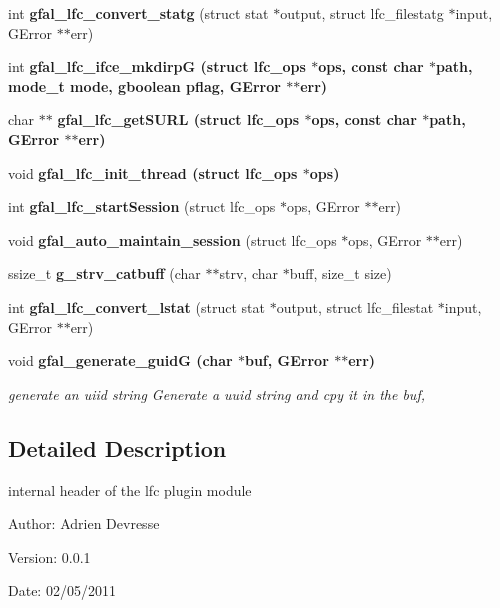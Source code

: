 \begin{CompactItemize}
\item 
int \textbf{gfal\_\-lfc\_\-convert\_\-statg} (struct stat $\ast$output, struct lfc\_\-filestatg $\ast$input, GError $\ast$$\ast$err)\label{lfc__ifce__ng_8h_79cceda78f871c9bd8568a636dd31206}

\item 
int \bf{gfal\_\-lfc\_\-ifce\_\-mkdirp\-G} (struct lfc\_\-ops $\ast$ops, const char $\ast$path, mode\_\-t mode, gboolean pflag, GError $\ast$$\ast$err)
\item 
char $\ast$$\ast$ \bf{gfal\_\-lfc\_\-get\-SURL} (struct lfc\_\-ops $\ast$ops, const char $\ast$path, GError $\ast$$\ast$err)
\item 
void \bf{gfal\_\-lfc\_\-init\_\-thread} (struct lfc\_\-ops $\ast$ops)
\item 
int \textbf{gfal\_\-lfc\_\-start\-Session} (struct lfc\_\-ops $\ast$ops, GError $\ast$$\ast$err)\label{lfc__ifce__ng_8h_191824f5c6bfee67e81f0c495e9bb778}

\item 
void \textbf{gfal\_\-auto\_\-maintain\_\-session} (struct lfc\_\-ops $\ast$ops, GError $\ast$$\ast$err)\label{lfc__ifce__ng_8h_9be7f93578b4772ec1498fe197f3c2c4}

\item 
ssize\_\-t \textbf{g\_\-strv\_\-catbuff} (char $\ast$$\ast$strv, char $\ast$buff, size\_\-t size)\label{lfc__ifce__ng_8h_bc04cd8d7342170700f02f6297fc4105}

\item 
int \textbf{gfal\_\-lfc\_\-convert\_\-lstat} (struct stat $\ast$output, struct lfc\_\-filestat $\ast$input, GError $\ast$$\ast$err)\label{lfc__ifce__ng_8h_16e8d4c4177c6e1d39c1850f06042f97}

\item 
void \bf{gfal\_\-generate\_\-guid\-G} (char $\ast$buf, GError $\ast$$\ast$err)
\begin{CompactList}\small\item\em generate an uiid string Generate a uuid string and cpy it in the buf, \item\end{CompactList}\end{CompactItemize}


\subsection{Detailed Description}
internal header of the lfc plugin module 

\begin{Desc}
\item[Author:]Adrien Devresse \end{Desc}
\begin{Desc}
\item[Version:]0.0.1 \end{Desc}
\begin{Desc}
\item[Date:]02/05/2011 \end{Desc}


